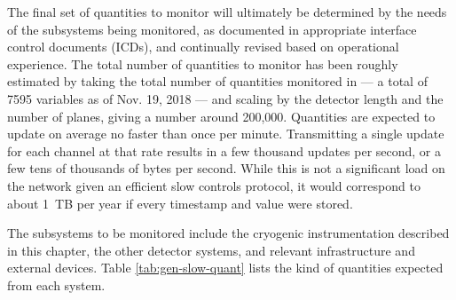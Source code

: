 The final set of quantities to monitor will ultimately be determined
by the needs of the subsystems being monitored, as documented in
appropriate  interface control documents (ICDs), and continually revised based on operational
experience.  The total number of quantities to monitor has been roughly estimated by taking the total number of quantities monitored
in \cite{pdspdcs_proc} --- a total of 7595 variables as of Nov. 19, 2018 --- and scaling by the detector length and the number of planes, giving a number around 200,000. %
Quantities are expected to update on average no faster than once per minute.
Transmitting a single update for each channel at that rate results in a few thousand updates per second, or a few tens of thousands of bytes per second. While this is not a significant load on the network given an efficient slow controls protocol, it would correspond to about 1~TB per year if every timestamp and value were stored.

The subsystems
to be monitored include the %
cryogenic instrumentation
described in this chapter, the other detector systems, and relevant
infrastructure and external devices. Table \ref{tab:gen-slow-quant}
lists the kind of quantities expected from each system.

